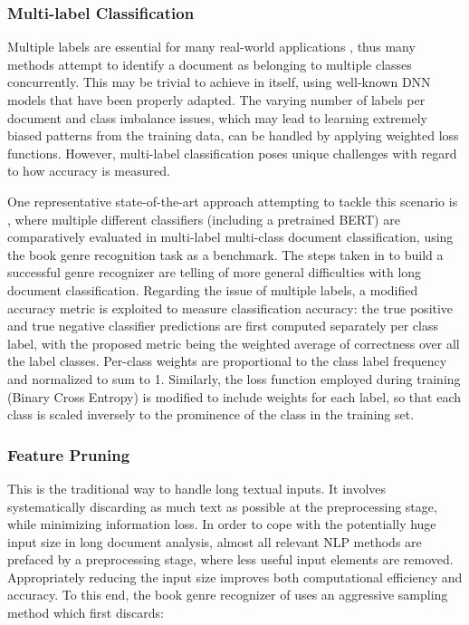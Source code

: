 \documentclass[preprint,review,10pt]{elsarticle}
\begin{document}
	
	\subsubsection{Multi-label Classification}
	Multiple labels are essential for many real-world applications \cite{hsu} \cite{patentnet}, thus many methods attempt to identify a document as belonging to multiple classes concurrently. This may be trivial to achieve in itself, using well-known DNN models that have been properly adapted. The varying number of labels per document and class imbalance issues, which may lead to learning extremely biased patterns from the training data, can be handled by applying weighted loss functions. However, multi-label classification poses unique challenges with regard to how accuracy is measured.
	
	One representative state-of-the-art approach attempting to tackle this scenario is \cite{sicong}, where multiple different classifiers (including a pretrained BERT) are comparatively evaluated in multi-label multi-class document classification, using the book genre recognition task as a benchmark. The steps taken in \cite{sicong} to build a successful genre recognizer are telling of more general difficulties with long document classification. Regarding the issue of multiple labels, a modified accuracy metric is exploited to measure classification accuracy: the true positive and true negative classifier predictions are first computed separately per class label, with the proposed metric being the weighted average of correctness over all the label classes. Per-class weights are proportional to the class label frequency and normalized to sum to 1. Similarly, the loss function employed during training (Binary Cross Entropy) is modified to include weights for each label, so that each class is scaled inversely to the prominence of the class in the training set.
	
	\subsubsection{Feature Pruning}
	This is the traditional way to handle long textual inputs. It involves systematically discarding as much text as possible at the preprocessing stage, while minimizing information loss. In order to cope with the potentially huge input size in long document analysis, almost all relevant NLP methods are prefaced by a preprocessing stage, where less useful input elements are removed. Appropriately reducing the input size improves both computational efficiency and accuracy. To this end, the book genre recognizer of \cite{sicong} uses an aggressive sampling method which first discards:
	
\end{document}
